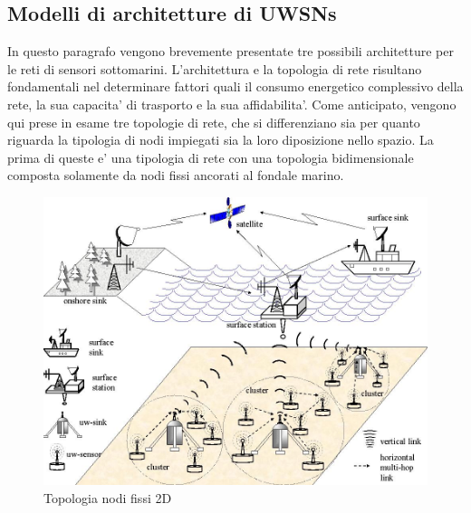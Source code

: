 \subsection{Modelli di architetture di UWSNs}
In questo paragrafo vengono brevemente presentate tre possibili architetture per le reti di sensori sottomarini. L'architettura e la topologia di rete risultano fondamentali nel determinare fattori quali il consumo energetico complessivo della rete, la sua capacita' di trasporto e la sua affidabilita'. \newline Come anticipato, vengono qui prese in esame tre topologie di rete, che si differenziano sia per quanto riguarda la tipologia di nodi impiegati sia la loro diposizione nello spazio.  La prima di queste e' una tipologia di rete con una topologia bidimensionale composta solamente da nodi fissi ancorati al fondale marino.

\begin{figure}[H]
    \centering
	\includegraphics[scale=0.3]{2D_arch.jpg}
	\caption{ Topologia nodi fissi 2D}
	\label{fig:}
\end{figure}


